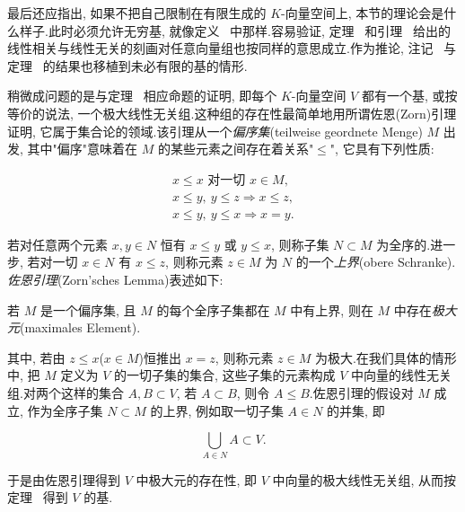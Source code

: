 最后还应指出, 如果不把自己限制在有限生成的 $K$-向量空间上, 本节的理论会是什么样子.此时必须允许无穷基, 就像定义~ 中那样.容易验证, 定理~ 和引理~ 给出的线性相关与线性无关的刻画对任意向量组也按同样的意思成立.作为推论, 注记~ 与定理~ 的结果也移植到未必有限的基的情形.

稍微成问题的是与定理~ 相应命题的证明, 即每个 $K$-向量空间 $V$ 都有一个基, 或按等价的说法, 一个极大线性无关组.这种组的存在性最简单地用所谓佐恩(Zorn)引理证明, 它属于集合论的领域.该引理从一个\emph{偏序集}(\textup{teilweise geordnete Menge}) $M$ 出发, 其中"偏序"意味着在 $M$ 的某些元素之间存在着关系"$\leq$", 它具有下列性质:

\[
\begin{array}{c}
x \leq x \text{ 对一切 } x \in M, \\
x \leq y,\ y \leq z \Longrightarrow x \leq z, \\
x \leq y,\ y \leq x \Longrightarrow x = y\text{.}
\end{array}
\]

若对任意两个元素 $x, y \in N$ 恒有 $x \leq y$ 或 $y \leq x$, 则称子集 $N \subset M$ 为全序的.进一步, 若对一切 $x \in N$ 有 $x \leq z$, 则称元素 $z \in M$ 为 $N$ 的一个\emph{上界}(\textup{obere Schranke}).\emph{佐恩引理}(\textup{Zorn'sches Lemma})表述如下:

\begin{lemma}[佐恩引理]\label{lem:1.5.15}
若 $M$ 是一个偏序集, 且 $M$ 的每个全序子集都在 $M$ 中有上界, 则在 $M$ 中存在\emph{极大元}(\textup{maximales Element}).
\end{lemma}

其中, 若由 $z \leq x$($x \in M$)恒推出 $x = z$, 则称元素 $z \in M$ 为极大.在我们具体的情形中, 把 $M$ 定义为 $V$ 的一切子集的集合, 这些子集的元素构成 $V$ 中向量的线性无关组.对两个这样的集合 $A, B \subset V$, 若 $A \subset B$, 则令 $A \leq B$.佐恩引理的假设对 $M$ 成立, 作为全序子集 $N \subset M$ 的上界, 例如取一切子集 $A \in N$ 的并集, 即

\[
\bigcup_{A \in N} A \subset V\text{.}
\]

于是由佐恩引理得到 $V$ 中极大元的存在性, 即 $V$ 中向量的极大线性无关组, 从而按定理~ 得到 $V$ 的基.

